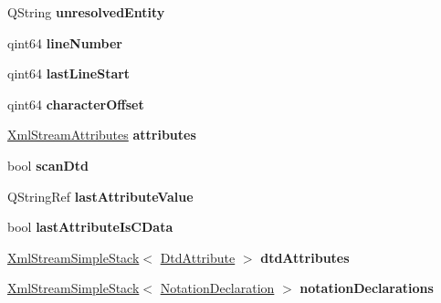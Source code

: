 \begin{DoxyCompactItemize}
Q\+String {\bfseries unresolved\+Entity}
\item 
\mbox{\label{class_xml_stream_reader_private_a2788aa367e52fd199ad75ecb68067e41}} 
qint64 {\bfseries line\+Number}
\item 
\mbox{\label{class_xml_stream_reader_private_ad43fda221025405470ed301427ccb9e5}} 
qint64 {\bfseries last\+Line\+Start}
\item 
\mbox{\label{class_xml_stream_reader_private_acd6464176b7a8cc673c7677e966b604e}} 
qint64 {\bfseries character\+Offset}
\item 
\mbox{\label{class_xml_stream_reader_private_af6b794f5227aa2c70632ea15de28731b}} 
\hyperlink{class_xml_stream_attributes}{Xml\+Stream\+Attributes} {\bfseries attributes}
\item 
\mbox{\label{class_xml_stream_reader_private_a607d3423273a5c899c48408d45245338}} 
bool {\bfseries scan\+Dtd}
\item 
\mbox{\label{class_xml_stream_reader_private_a683eaf8a87b6648a9f1f1991b8ca264b}} 
Q\+String\+Ref {\bfseries last\+Attribute\+Value}
\item 
\mbox{\label{class_xml_stream_reader_private_abade06438edf9efd3b87377d77e7ea37}} 
bool {\bfseries last\+Attribute\+Is\+C\+Data}
\item 
\mbox{\label{class_xml_stream_reader_private_a349eb3c4791e5642a654c7bc0f854342}} 
\hyperlink{class_xml_stream_simple_stack}{Xml\+Stream\+Simple\+Stack}$<$ \hyperlink{struct_xml_stream_reader_private_1_1_dtd_attribute}{Dtd\+Attribute} $>$ {\bfseries dtd\+Attributes}
\item 
\mbox{\label{class_xml_stream_reader_private_afebc6ce175218f72a0bbdb794fbad896}} 
\hyperlink{class_xml_stream_simple_stack}{Xml\+Stream\+Simple\+Stack}$<$ \hyperlink{struct_xml_stream_reader_private_1_1_notation_declaration}{Notation\+Declaration} $>$ {\bfseries notation\+Declarations}

\end{DoxyCompactItemize}
